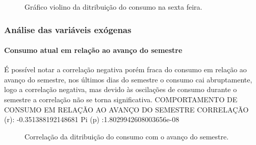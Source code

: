 \documentclass[	12pt, Times, openright, twoside, a4paper, english, brazil]{abntex2}
\begin{document}
                \begin{figure}[!ht]
                	\caption{Gráfico violino da ditribuição do consumo na sexta feira. \label{fig:case1_violinplot_sexta} }
                \end{figure}
    	    \subsubsection{Análise das variáveis exógenas}
    	        \paragraph{Consumo atual em relação ao avanço do semestre}
    	            É possível notar  a correlação negativa porém fraca do consumo em relação ao avanço do semestre, nos últimos dias do semestre o consumo cai abruptamente, logo a correlação negativa, mas devido às oscilações de consumo durante o semestre  a correlação não se torna significativa.\newline
    	            COMPORTAMENTO DE CONSUMO EM RELAÇÃO AO AVANÇO DO SEMESTRE\newline 
                    CORRELAÇÃO (r): -0.351388192148681\newline
                    Pi (p) :1.8029942608003656e-08\newline
                    \begin{figure}[!ht]
                    	\caption{Correlação da ditribuição do consumo com o avanço do semestre. \label{fig:case1_perc_sem} }
                    \end{figure}
                
\end{document}
